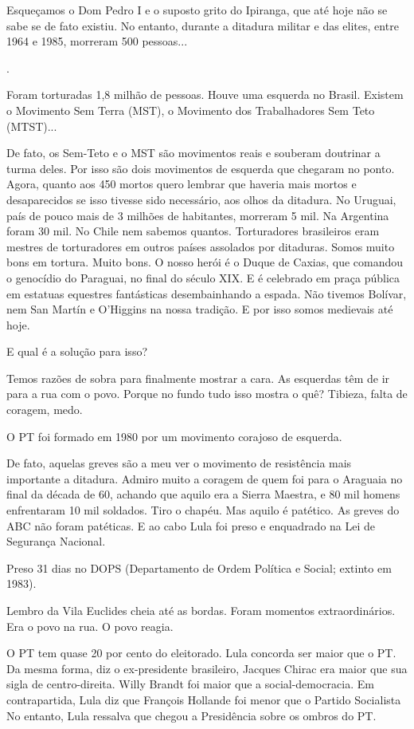 \falaG Esqueçamos o Dom Pedro I e o suposto grito do Ipiranga, que até hoje
não se sabe se de fato existiu. No entanto, durante a ditadura militar e
das elites, entre 1964 e 1985, morreram 500 pessoas...

.

\falaG Foram torturadas 1,8 milhão de pessoas. Houve uma esquerda no Brasil.
Existem o Movimento Sem Terra (MST), o Movimento dos Trabalhadores Sem
Teto (MTST)...

\falaM De fato, os Sem-Teto e o MST são movimentos reais e souberam
doutrinar a turma deles. Por isso são dois movimentos de esquerda que
chegaram no ponto. Agora, quanto aos 450 mortos quero lembrar que
haveria mais mortos e desaparecidos se isso tivesse sido necessário, aos
olhos da ditadura. No Uruguai, país de pouco mais de 3 milhões de
habitantes, morreram 5 mil. Na Argentina foram 30 mil. No Chile nem
sabemos quantos. Torturadores brasileiros eram mestres de torturadores
em outros países assolados por ditaduras. Somos muito bons em tortura.
Muito bons. O nosso herói é o Duque de Caxias, que comandou o genocídio
do Paraguai, no final do século XIX. E é celebrado em praça pública em
estatuas equestres fantásticas desembainhando a espada. Não tivemos
Bolívar, nem San Martín e O'Higgins na nossa tradição. E por isso somos
medievais até hoje.

\falaG E qual é a solução para isso?

\falaM Temos razões de sobra para finalmente mostrar a cara. As esquerdas
têm de ir para a rua com o povo. Porque no fundo tudo isso mostra o quê?
Tibieza, falta de coragem, medo.

\falaG O PT foi formado em 1980 por um movimento corajoso de esquerda.

\falaM De fato, aquelas greves são a meu ver o movimento de resistência mais
importante a ditadura. Admiro muito a coragem de quem foi para o
Araguaia no final da década de 60, achando que aquilo era a Sierra
Maestra, e 80 mil homens enfrentaram 10 mil soldados. Tiro o chapéu. Mas
aquilo é patético. As greves do ABC não foram patéticas. E ao cabo Lula
foi preso e enquadrado na Lei de Segurança Nacional.

\falaG Preso 31 dias no DOPS (Departamento de Ordem Política e Social;
extinto em 1983).

\falaM Lembro da Vila Euclides cheia até as bordas. Foram momentos
extraordinários. Era o povo na rua. O povo reagia.

\falaG O PT tem quase 20 por cento do eleitorado. Lula concorda ser maior
que o PT. Da mesma forma, diz o ex-presidente brasileiro, Jacques Chirac
era maior que sua sigla de centro-direita. Willy Brandt foi maior que a
social-democracia. Em contrapartida, Lula diz que François Hollande foi
menor que o Partido Socialista No entanto, Lula ressalva que chegou a
Presidência sobre os ombros do PT.

